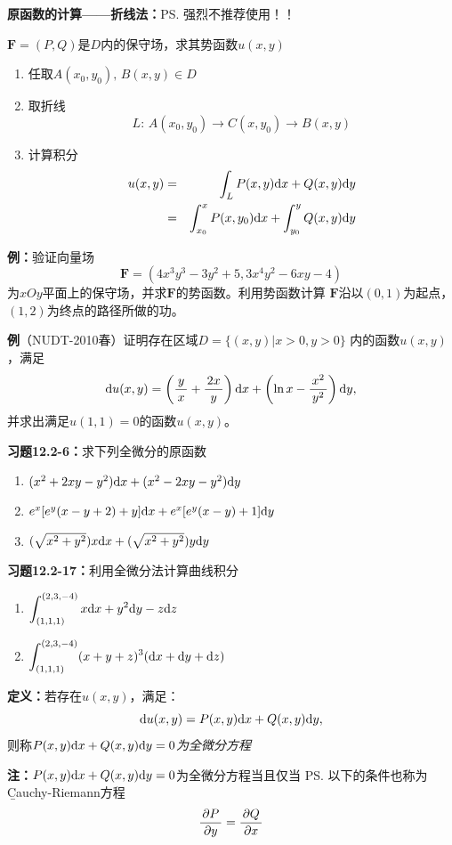 {\bf 原函数的计算——折线法：}\ps{强烈不推荐使用！！}

$\bm{F}=(P,Q)$是$D$内的保守场，求其势函数$u(x,y)$

\begin{enumerate}[Step-1:]
  \setlength{\itemindent}{1cm}
  \item 任取$A(x_0,y_0),\,B(x,y)\in D$ 
  \item 取折线
  $${L:\,A(x_0,y_0)\to C(x,y_0)\to B(x,y)} $$
  \item 计算积分
  \begin{eqnarray*}
  	u(x,y)&=&\displaystyle\int_LP(x,y)\mathrm{d} x+Q(x,y)\mathrm{d} y \\
  	&=&{\displaystyle\int_{x_0}^xP(x,y_0)\mathrm{d} x+\displaystyle\int_{y_0}^yQ(x,y)\mathrm{d} y}
  \end{eqnarray*}
\end{enumerate}

{\bf 例：}验证向量场
$$\bm{F}=(4x^3y^3-3y^2+5,3x^4y^2-6xy-4)$$
为$xOy$平面上的保守场，并求$\bm{F}$的势函数。利用势函数计算
$\bm{F}$沿以$(0,1)$为起点，$(1,2)$为终点的路径所做的功。

{\bf 例}（NUDT-2010春）证明存在区域$D=\{(x,y)|x>0,y>0\}$
内的函数$u(x,y)$，满足
$$\mathrm{d} u(x,y)=\left(\displaystyle\frac{\,{y}\,}{\,{x}\,}+\displaystyle\frac{\,{2x}\,}{\,{y}\,}\right)\mathrm{d} x
+\left(\ln x-\displaystyle\frac{\,{x^2}\,}{\,{y^2}\,}\right)\mathrm{d} y,$$
并求出满足$u(1,1)=0$的函数$u(x,y)$。

{\bf 习题12.2-6：}求下列全微分的原函数
\begin{enumerate}[(1)]
  \setlength{\itemindent}{1cm}
  \item $(x^2+2xy-y^2)\mathrm{d} x+(x^2-2xy-y^2)\mathrm{d} y$
  \item $e^x[e^y(x-y+2)+y]\mathrm{d} x+e^x[e^y(x-y)+1]\mathrm{d} y$
  \item $(\sqrt{x^2+y^2})x\mathrm{d} x+(\sqrt{x^2+y^2})y\mathrm{d} y$
\end{enumerate}

{\bf 习题12.2-17：}利用全微分法计算曲线积分
\begin{enumerate}[(1)]
  \setlength{\itemindent}{1cm}
  \item $\displaystyle\int_{(1,1,1)}^{(2,3,-4)}x\mathrm{d} x+y^2\mathrm{d} y-z\mathrm{d} z$
  \item $\displaystyle\int_{(1,1,1)}^{(2,3,-4)}(x+y+z)^3(\mathrm{d} x+\mathrm{d} y+\mathrm{d} z)$
\end{enumerate}

{\bf 定义：}若存在$u(x,y)$，满足：
$$\mathrm{d} u(x,y)=P(x,y)\mathrm{d} x+Q(x,y)\mathrm{d} y,$$
则称{\it $P(x,y)\mathrm{d} x+Q(x,y)\mathrm{d} y=0$为全微分方程}

{\bf 注：}$P(x,y)\mathrm{d} x+Q(x,y)\mathrm{d} y=0$为全微分方程当且仅当
\ps{以下的条件也称为{\b Cauchy-Riemann方程}}
$$\displaystyle\frac{\,{\partial P}\,}{\,{\partial y}\,}=\displaystyle\frac{\,{\partial Q}\,}{\,{\partial x}\,}$$


